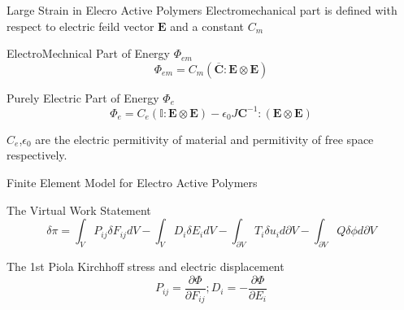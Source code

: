\documentclass{beamer}
\begin{document}
\begin{frame}{Large Strain in Elecro Active Polymers}
Electromechanical part is defined with respect to electric feild vector
$\mathbf{E}$ and a constant $C_m$
\begin{block}{ElectroMechnical Part of Energy $\Phi_{em}$}
\begin{equation} 
\Phi_{em}=C_m (\overline{\mathbf{C}} : \mathbf{E}\otimes \mathbf{E})
\label{EQN:eap_electromechanical_part_1}
\end{equation}
\end{block} 

\begin{block}{Purely Electric Part of Energy $\Phi_{e}$}
\begin{equation} 
\Phi_{e}=C_e (\mathbb{I} : \mathbf{E}\otimes \mathbf{E})-\epsilon_0 J \mathbf{C}^{-1} :(\mathbf{E}\otimes \mathbf{E})
\label{EQN:eap_electric_part_02}
\end{equation}
\end{block} 
$C_e$,$\epsilon_0$ are the electric permitivity of material and permitivity of
free space respectively.

\end{frame}

\begin{frame}{Finite Element Model for Electro Active Polymers}
\begin{block}{The Virtual Work Statement}
\begin{equation} 
\delta \pi=\int_V P_{ij}\delta F_{ij} dV -\int_V D_{i}\delta E_{i}
dV-\int_{\partial V} T_{i}\delta u_{i} d{\partial V}-\int_{\partial V} Q\delta \phi d{\partial V}
\label{EQN:eap_electromechanical_part}
\end{equation}
\end{block} 

\begin{block}{The 1st Piola Kirchhoff stress and electric displacement}
\begin{equation} 
P_{ij}=\frac{\partial \Phi}{\partial F_{ij}} ;D_{i}=-\frac{\partial \Phi}{\partial E_{i}}
\label{EQN:eap_electric_part}
\end{equation}
\end{block} 
\end{frame}
\end{document}
